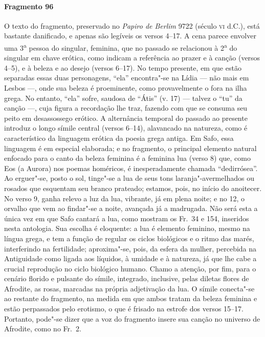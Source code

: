 \paragraph{Fragmento 96}

{\small O texto do fragmento, preservado no \textit{Papiro de Berlim} 9722 (século \textsc{vi}
d.C.), está bastante danificado, e apenas são legíveis os versos 4--17.
A cena parece envolver uma 3\textsuperscript{a} pessoa do
singular, feminina, que no passado se relacionou à 2\textsuperscript{a} do
singular em chave erótica, como indicam a referência ao prazer e à canção		
(versos 4--5), e à beleza e ao desejo (versos 6--17). No tempo presente, 
em que estão separadas essas duas personagens, ``ela” encontra"-se na Lídia --- não
mais em Lesbos ---, onde sua beleza é proeminente, como provavelmente o fora na
ilha grega. No entanto, ``ela” sofre, saudosa de ``Átis” (v.
17) --- talvez o ``tu” da canção ---, cuja figura a recordação lhe traz, fazendo
com que se consuma seu peito em desassossego erótico. A alternância temporal do
passado ao presente introduz o longo símile central (versos 6--14), alavancado
na natureza, como é característico da linguagem erótica da poesia grega antiga.
Em Safo, essa linguagem é em especial elaborada; e no fragmento, o principal
elemento natural enfocado para o canto da beleza feminina é a feminina lua
(verso 8) que, como Eos (a Aurora) nos poemas homéricos, é inesperadamente
chamada ``dedirrósea”. Ao erguer"-se, posto o sol, tinge"-se a lua
de seus tons laranja"-avermelhados ou rosados que esquentam seu branco prateado;
estamos, pois, no início do anoitecer. No verso 9, ganha relevo a luz da lua,
vibrante, já em plena noite; e no 12, o orvalho que vem ao findar"-se a noite,
avançada já a madrugada. Não será esta a única vez em que Safo cantará a lua,
como mostram os Fr.~34 e 154, inseridos nesta antologia. Sua escolha é
eloquente: a lua é elemento feminino, mesmo na língua grega, e tem a função de
regular os ciclos biológicos e o ritmo das marés, interferindo na fertilidade;
aproxima"-se, pois, da esfera da mulher, percebida na Antiguidade como ligada
aos líquidos, à umidade e à natureza, já que lhe cabe a crucial
reprodução no ciclo biológico humano. Chamo a atenção, por fim, para o cenário
florido e pulsante do símile, integrado, inclusive, pelas diletas flores de
Afrodite, as rosas, marcadas na própria adjetivação da lua. O símile conecta"-se
ao restante do fragmento, na medida em que ambos tratam da beleza feminina e
estão perpassados pelo erotismo, o que é frisado na estrofe dos versos 15--17.
Portanto, pode"-se dizer que a voz do fragmento insere sua canção no universo de
Afrodite, como no Fr.~2. }

